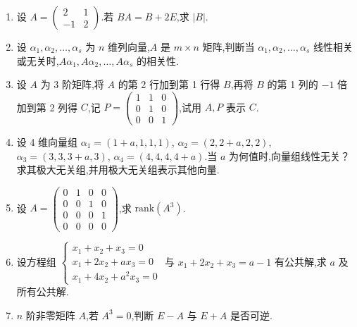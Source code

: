 \begin{enumerate}
	\item 设 $A = \begin{pmatrix} 2 & 1 \\ -1 & 2 \end{pmatrix}$.若 $BA = B + 2E$,求 $|B|$.
	
	\item 设 $\alpha_1, \alpha_2, \dots, \alpha_s$ 为 $n$ 维列向量,$A$ 是 $m \times n$ 矩阵,判断当 $\alpha_1, \alpha_2, \dots, \alpha_s$ 线性相关或无关时,$A\alpha_1, A\alpha_2, \dots, A\alpha_s$ 的相关性.
	
	\item 设 $A$ 为 3 阶矩阵,将 $A$ 的第 2 行加到第 1 行得 $B$,再将 $B$ 的第 1 列的 $-1$ 倍加到第 2 列得 $C$,记 $P = \begin{pmatrix} 1 & 1 & 0 \\ 0 & 1 & 0 \\ 0 & 0 & 1 \end{pmatrix}$,试用 $A, P$ 表示 $C$.
	
	\item 设 4 维向量组 $\alpha_1 = (1+a, 1, 1, 1)$, $\alpha_2 = (2, 2+a, 2, 2)$, $\alpha_3 = (3, 3, 3+a, 3)$, $\alpha_4 = (4, 4, 4, 4+a)$.当 $a$ 为何值时,向量组线性无关？求其极大无关组,并用极大无关组表示其他向量.
	
	\item 设 $A = \begin{pmatrix} 0 & 1 & 0 & 0 \\ 0 & 0 & 1 & 0 \\ 0 & 0 & 0 & 1 \\ 0 & 0 & 0 & 0 \end{pmatrix}$,求 $\text{rank}(A^3)$.
	
	\item 设方程组 $\begin{cases} x_1 + x_2 + x_3 = 0 \\ x_1 + 2x_2 + ax_3 = 0 \\ x_1 + 4x_2 + a^2 x_3 = 0 \end{cases}$ 与 $ x_1 + 2x_2 + x_3 = a-1 $ 有公共解,求 $a$ 及所有公共解.
	
	\item $n$ 阶非零矩阵 $A$,若 $A^3 = 0$,判断 $E-A$ 与 $E+A$ 是否可逆.
	

\end{enumerate}
